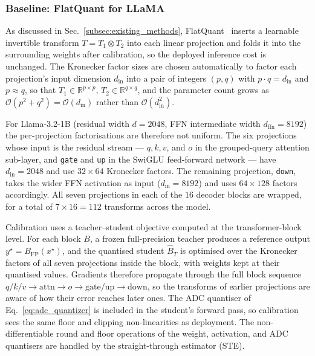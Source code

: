\documentclass[a4paper,11pt,oneside]{article}
\theoremstyle{breakstyle}
\begin{document}
  \subsubsection{Baseline: FlatQuant for LLaMA}

  As discussed in Sec.~\ref{subsec:existing_methods},
  FlatQuant~\cite{FlatQuant2024} inserts a learnable invertible
  transform $T = T_1 \otimes T_2$ into each linear projection and
  folds it into the surrounding weights after calibration, so the
  deployed inference cost is unchanged.  The Kronecker factor sizes
  are chosen automatically to factor each projection's input
  dimension $d_{\mathrm{in}}$ into a pair of integers
  $(p, q)$ with $p \cdot q = d_{\mathrm{in}}$ and $p \approx q$, so
  that $T_1 \in \mathbb{R}^{p \times p}$,
  $T_2 \in \mathbb{R}^{q \times q}$, and the parameter count grows
  as $\mathcal{O}(p^2 + q^2) = \mathcal{O}(d_{\mathrm{in}})$ rather
  than $\mathcal{O}(d_{\mathrm{in}}^2)$.

  For Llama-3.2-1B (residual width $d = 2048$, FFN intermediate
  width $d_{\mathrm{ffn}} = 8192$) the per-projection factorisations
  are therefore not uniform.  The six projections whose input is the
  residual stream --- $q, k, v$, and $o$ in the grouped-query
  attention sub-layer, and \texttt{gate} and \texttt{up} in the
  SwiGLU feed-forward network --- have $d_{\mathrm{in}} = 2048$ and
  use $32 \times 64$ Kronecker factors.  The remaining projection,
  \texttt{down}, takes the wider FFN activation as input
  ($d_{\mathrm{in}} = 8192$) and uses $64 \times 128$ factors
  accordingly.  All seven projections in each of the $16$ decoder
  blocks are wrapped, for a total of $7 \times 16 = 112$ transforms
  across the model.

  Calibration uses a teacher--student objective computed at the
  transformer-block level. For each block $B$, a frozen full-precision
  teacher produces a reference output $y^\star = B_{\mathrm{FP}}(x^\star)$,
  and the quantised student $\hat{B}_T$ is optimised over the Kronecker
  factors of all seven projections inside the block, with weights kept
  at their quantised values. Gradients therefore propagate through the
  full block sequence
  $q/k/v \to \mathrm{attn} \to o \to \mathrm{gate}/\mathrm{up} \to \mathrm{down}$,
  so the transforms of earlier projections are aware of how their
  error reaches later ones. The ADC quantiser of
  Eq.~\eqref{eq:adc_quantizer} is included in the student's forward
  pass, so calibration sees the same floor and clipping non-linearities
  as deployment. The non-differentiable round and floor operations of
  the weight, activation, and ADC quantisers are handled by the
  straight-through estimator (STE).
\end{document}

